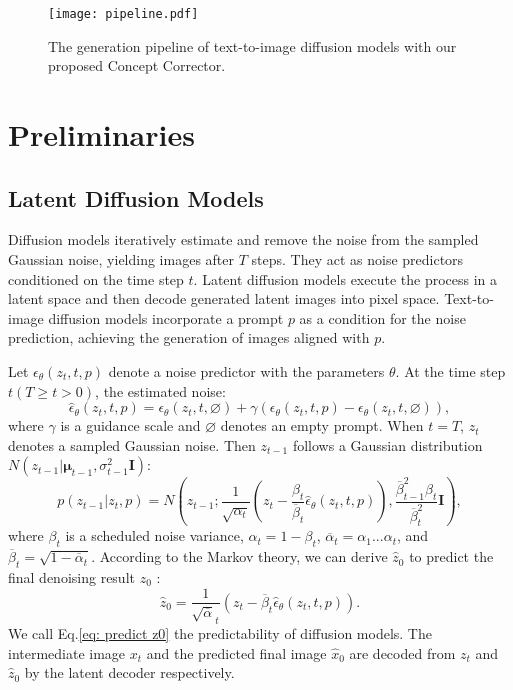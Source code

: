 \begin{figure*}[]
    \centering
    \texttt{[image: pipeline.pdf]}
    \caption{The generation pipeline of text-to-image diffusion models with our proposed Concept Corrector.}
    \label{fig: pipeline}
\end{figure*}

\section{Preliminaries}
\subsection{Latent Diffusion Models}
\label{sec: ldm}

Diffusion models \cite{sohl2015deep, ho2020denoising} iteratively estimate and remove the noise from the sampled Gaussian noise, yielding images after $T$ steps. They act as noise predictors conditioned on the time step $t$. Latent diffusion models \cite{rombach2022high} execute the process in a latent space and then decode generated latent images into pixel space. Text-to-image diffusion models \cite{ho2021classifier} incorporate a prompt $p$ as a condition for the noise prediction, achieving the generation of images aligned with $p$.

Let $\epsilon_\theta(z_t, t, p)$ denote a noise predictor with the parameters $\theta$. At the time step $t (T \geq t > 0)$, the estimated noise:
\begin{equation}
    \hat{\epsilon}_\theta(z_t, t, p) = \epsilon_\theta(z_t, t, \varnothing) + \gamma (\epsilon_\theta(z_t, t, p) - \epsilon_\theta(z_t, t, \varnothing)),
\end{equation}
where $\gamma$ is a guidance scale and $\varnothing $ denotes an empty prompt. When $t=T$, $z_t$ denotes a sampled Gaussian noise. Then $z_{t-1}$ follows a Gaussian distribution $N(z_{t-1}|\bm{\mu}_{t-1}, \sigma_{t-1}^2\mathbf{I})$:
\begin{equation}
    p(z_{t-1}|z_t, p) = N(z_{t-1};\frac{1}{\sqrt{\alpha_t}}(z_t-\frac{\beta_t}{\overline{\beta}_t}\hat{\epsilon}_\theta(z_t, t, p)), \frac{\overline{\beta}_{t-1}^2\beta_t}{\overline{\beta}_t^2}\mathbf{I}),
\end{equation}
where $\beta_t$ is a scheduled noise variance, $\alpha_t={1-\beta_t}$, $\overline{\alpha}_t=\alpha_1...\alpha_t$, and $\overline{\beta}_t=\sqrt{1-\overline{\alpha}_t}$. According to the Markov theory, we can derive $\hat{z}_0$ to predict the final denoising result $z_0$ \cite{sohl2015deep}:
\begin{equation}
\label{eq: predict z0}
    \hat{z}_0 = \frac{1}{\sqrt{\overline{\alpha}}_t}(z_t-\overline{\beta}_t\hat{\epsilon}_\theta(z_t, t, p)).
\end{equation}
We call Eq.\ref{eq: predict z0} the predictability of diffusion models. The intermediate image $x_t$ and the predicted final image $\hat{x}_0$ are decoded from $z_t$ and $\hat{z}_0$ by the latent decoder respectively.



